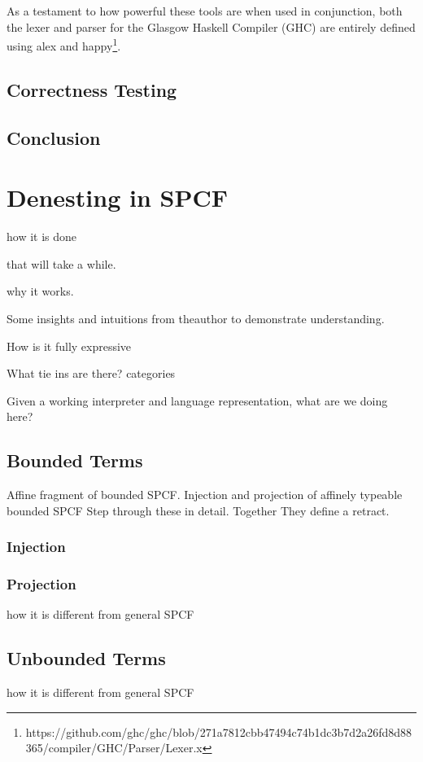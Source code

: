 \documentclass[12pt,a4paper]{report}
\theoremstyle{definition}
\theoremstyle{remark}
\begin{document}
As a testament to how powerful these tools are when used in conjunction, both the lexer and parser for the Glasgow Haskell Compiler (GHC) are entirely defined using alex and happy\footnote{https://github.com/ghc/ghc/blob/271a7812cbb47494c74b1dc3b7d2a26fd8d88365/compiler/GHC/Parser/Lexer.x}. 

\section{Correctness Testing}
\section{Conclusion}

\chapter{Denesting in SPCF}

how it is done 

that will take a while.

why it works.

Some insights and intuitions from theauthor to demonstrate understanding.

How is it fully expressive

What tie ins are there? categories

Given a working interpreter
and language representation, what are we doing here?

\section{Bounded Terms}

Affine fragment of bounded SPCF.
Injection and projection of affinely typeable bounded SPCF
Step through these in detail. Together They define a retract. 
\subsection{Injection}

\subsection{Projection}

how it is different from general SPCF
\section{Unbounded Terms}
how it is different from general SPCF
\end{document}
